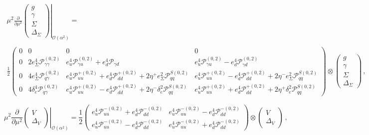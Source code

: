 \begin{equation}
\begin{array}{c}
\displaystyle\left.\mu^2\frac{\partial}{\partial \mu^2}
\begin{pmatrix}
g\\
\gamma\\
\Sigma\\
\Delta_\Sigma
\end{pmatrix}
  \right|_{\mathcal{O}(\alpha^2)} =\\
\\
 \displaystyle \frac12\begin{pmatrix}
    0 & 0 & 0 & 0 \\
    0 & 2e_\Sigma^4 \mathcal{P}_{\gamma\gamma}^{(0,2)} & e_u^4 \mathcal{P}_{\gamma
      u}^{(0,2)} + e_d^4 \mathcal{P}_{\gamma d} & e_u^4 \mathcal{P}_{\gamma u}^{(0,2)} - e_d^4 \mathcal{P}_{\gamma d}^{(0,2)}\\
    0 & 4 e_\Sigma^4 \mathcal{P}^{(0,2)}_{q\gamma} &
    e_u^4\mathcal{P}_{uu}^{+(0,2)}
    +e_d^4\mathcal{P}_{dd}^{+(0,2)}+2\eta^+e_\Sigma^2\mathcal{P}^{S(0,2)}_{qq} & e_u^4\mathcal{P}_{uu}^{+(0,2)}-e_d^4\mathcal{P}_{dd}^{+(0,2)} + 2\eta^-e_\Sigma^2\mathcal{P}^{S(0,2)}_{qq}\\
    0 & 4 \delta_e^4 \mathcal{P}^{(0,2)}_{q\gamma} & e_u^4\mathcal{P}_{uu}^{+(0,2)}
    -e_d^4\mathcal{P}_{dd}^{+(0,2)}+2\eta^-\delta_e^2
    \mathcal{P}^{S(0,2)}_{qq} & e_u^4\mathcal{P}_{uu}^{+(0,2)}+e_d^4\mathcal{P}_{dd}^{+(0,2)} + 2\eta^+\delta_e^2 \mathcal{P}^{S(0,2)}_{qq}
\end{pmatrix}\otimes
\begin{pmatrix}
g\\
\gamma\\
\Sigma\\
\Delta_\Sigma
\end{pmatrix}\,,
\end{array}
\end{equation}

\begin{equation}
\displaystyle\left.\mu^2\frac{\partial}{\partial \mu^2}
\begin{pmatrix}
V\\
\Delta_V
\end{pmatrix} \right|_{\mathcal{O}(\alpha^2)}= \frac12
\begin{pmatrix}
e_u^4\mathcal{P}_{uu}^{-(0,2)}+e_d^4\mathcal{P}_{dd}^{-(0,2)} & e_u^4\mathcal{P}_{uu}^{-(0,2)}-e_d^4\mathcal{P}_{dd}^{-(0,2)} \\
e_u^4\mathcal{P}_{uu}^{-(0,2)}-e_d^4\mathcal{P}_{dd}^{-(0,2)} & e_u^4\mathcal{P}_{uu}^{-(0,2)}+e_d^4\mathcal{P}_{dd}^{-(0,2)} 
\end{pmatrix}\otimes
\begin{pmatrix}
V\\
\Delta_V
\end{pmatrix}\,,
\end{equation}

